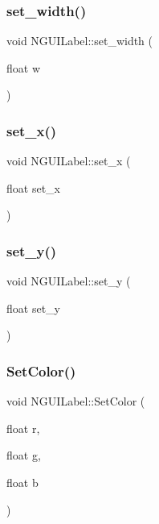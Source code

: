 \subsubsection{\texorpdfstring{set\+\_\+width()}{set\_width()}}
{\footnotesize\ttfamily void N\+G\+U\+I\+Label\+::set\+\_\+width (\begin{DoxyParamCaption}\item[{float}]{w }\end{DoxyParamCaption})}

\hypertarget{class_n_g_u_i_label_ae24a66b242a2c707de28432462aec568}{}\label{class_n_g_u_i_label_ae24a66b242a2c707de28432462aec568} 
\subsubsection{\texorpdfstring{set\+\_\+x()}{set\_x()}}
{\footnotesize\ttfamily void N\+G\+U\+I\+Label\+::set\+\_\+x (\begin{DoxyParamCaption}\item[{float}]{set\+\_\+x }\end{DoxyParamCaption})}

\hypertarget{class_n_g_u_i_label_a50e7dd1ae83454757e00d117a1622940}{}\label{class_n_g_u_i_label_a50e7dd1ae83454757e00d117a1622940} 
\subsubsection{\texorpdfstring{set\+\_\+y()}{set\_y()}}
{\footnotesize\ttfamily void N\+G\+U\+I\+Label\+::set\+\_\+y (\begin{DoxyParamCaption}\item[{float}]{set\+\_\+y }\end{DoxyParamCaption})}

\hypertarget{class_n_g_u_i_label_a36c48465b9f84282ec9c1e679317e3b2}{}\label{class_n_g_u_i_label_a36c48465b9f84282ec9c1e679317e3b2} 
\subsubsection{\texorpdfstring{Set\+Color()}{SetColor()}\hspace{0.1cm}{\footnotesize\ttfamily [1/2]}}
{\footnotesize\ttfamily void N\+G\+U\+I\+Label\+::\+Set\+Color (\begin{DoxyParamCaption}\item[{float}]{r,  }\item[{float}]{g,  }\item[{float}]{b }\end{DoxyParamCaption})}

